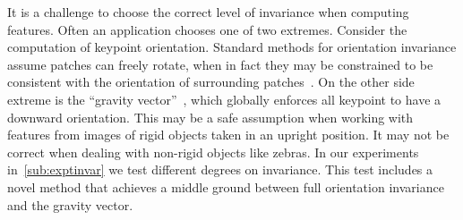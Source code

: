         It is a challenge to choose the correct level of invariance when computing features. Often an application
        chooses one of two extremes. Consider the computation of keypoint orientation. Standard methods for
        orientation invariance assume patches can freely rotate, when in fact they may be constrained to be
        consistent with the orientation of surrounding patches~\cite{lowe_distinctive_2004}. On the other side
        extreme is the ``gravity vector''~\cite{perdoch_efficient_2009}, which globally enforces all keypoint to
        have a downward orientation. This may be a safe assumption when working with features from images of rigid
        objects taken in an upright position. It may not be correct when dealing with non-rigid objects like
        zebras.
        In our experiments in~\cref{sub:exptinvar} we test different degrees on invariance. This test includes a
        novel method that achieves a middle ground between full orientation invariance and the gravity vector.

